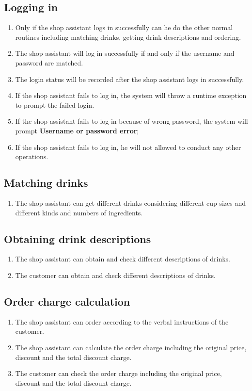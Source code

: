 \documentclass[a4paper]{report}
\begin{document}
\subsection{Logging in}
\begin{enumerate}
\item Only if the shop assistant logs in successfully can he do the other normal routines including matching drinks, getting drink descriptions and ordering.
\item The shop assistant will log in successfully if and only if the username and password are matched.
\item The login status will be recorded after the shop assistant logs in successfully.
\item If the shop assistant fails to log in, the system will throw a runtime exception to prompt the failed login.
\item If the shop assistant fails to log in because of wrong password, the system will prompt \textbf{Username or password error};
\item If the shop assistant fails to log in, he will not allowed to conduct any other operations.
\end{enumerate}

\subsection{Matching drinks}

\begin{enumerate}
\item The shop assistant can get different drinks considering different cup sizes and different kinds and numbers of ingredients.
\end{enumerate}


\subsection{Obtaining drink descriptions}
\begin{enumerate}
\item The shop assistant can obtain and check different descriptions of drinks.
\item The customer can obtain and check different descriptions of drinks.
\end{enumerate}

\subsection{Order charge calculation}
\begin{enumerate}
\item The shop assistant can order according to the verbal instructions of the customer.
\item The shop assistant can calculate the order charge including the original price, discount and the total discount charge.
\item The customer can check the order charge including the original price, discount and the total discount charge.
\end{enumerate}
\end{document}
